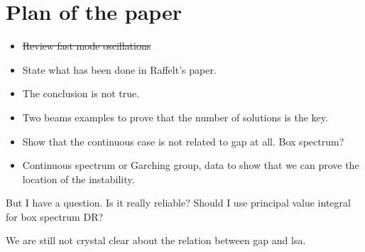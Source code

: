 \documentclass[%
preprint,
 amsmath,amssymb,
 aps,
 prd
]{revtex4-1}
\begin{document}
\appendix
\section{\label{sec-outline}Plan of the paper}



\begin{itemize}
    \item \sout{Review fast mode oscillations}
    \item State what has been done in Raffelt's paper.
    \item The conclusion is not true.
    \item Two beams examples to prove that the number of solutions is the key.
    \item Show that the continuous case is not related to gap at all. Box spectrum?
    \item Continuous spectrum or Garching group, data to show that we can prove the location of the instability.
\end{itemize}


But I have a question. Is it really reliable? Should I use principal value integral for box spectrum DR?

We are still not crystal clear about the relation between gap and lsa.







\end{document}
